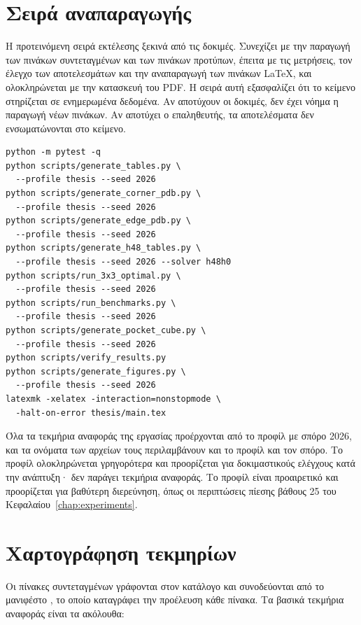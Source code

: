 \section{Σειρά αναπαραγωγής}
\label{sec:repro-order}

Η προτεινόμενη σειρά εκτέλεσης ξεκινά από τις δοκιμές. Συνεχίζει με την παραγωγή των πινάκων συντεταγμένων και των πινάκων προτύπων, έπειτα με τις μετρήσεις, τον έλεγχο των αποτελεσμάτων και την αναπαραγωγή των πινάκων LaTeX, και ολοκληρώνεται με την κατασκευή του PDF. Η σειρά αυτή εξασφαλίζει ότι το κείμενο στηρίζεται σε ενημερωμένα δεδομένα. Αν αποτύχουν οι δοκιμές, δεν έχει νόημα η παραγωγή νέων πινάκων. Αν αποτύχει ο επαληθευτής, τα αποτελέσματα δεν ενσωματώνονται στο κείμενο.

\begin{verbatim}
python -m pytest -q
python scripts/generate_tables.py \
  --profile thesis --seed 2026
python scripts/generate_corner_pdb.py \
  --profile thesis --seed 2026
python scripts/generate_edge_pdb.py \
  --profile thesis --seed 2026
python scripts/generate_h48_tables.py \
  --profile thesis --seed 2026 --solver h48h0
python scripts/run_3x3_optimal.py \
  --profile thesis --seed 2026
python scripts/run_benchmarks.py \
  --profile thesis --seed 2026
python scripts/generate_pocket_cube.py \
  --profile thesis --seed 2026
python scripts/verify_results.py
python scripts/generate_figures.py \
  --profile thesis --seed 2026
latexmk -xelatex -interaction=nonstopmode \
  -halt-on-error thesis/main.tex
\end{verbatim}

Όλα τα τεκμήρια αναφοράς της εργασίας προέρχονται από το προφίλ  με σπόρο 2026, και τα ονόματα των αρχείων τους περιλαμβάνουν και το προφίλ και τον σπόρο. Το προφίλ  ολοκληρώνεται γρηγορότερα και προορίζεται για δοκιμαστικούς ελέγχους κατά την ανάπτυξη· δεν παράγει τεκμήρια αναφοράς. Το προφίλ  είναι προαιρετικό και προορίζεται για βαθύτερη διερεύνηση, όπως οι περιπτώσεις πίεσης βάθους 25 του Κεφαλαίου~\ref{chap:experiments}.

\section{Χαρτογράφηση τεκμηρίων}
\label{sec:repro-artifacts}

Οι πίνακες συντεταγμένων γράφονται στον κατάλογο  και συνοδεύονται από το μανιφέστο , το οποίο καταγράφει την προέλευση κάθε πίνακα. Τα βασικά τεκμήρια αναφοράς είναι τα ακόλουθα:

